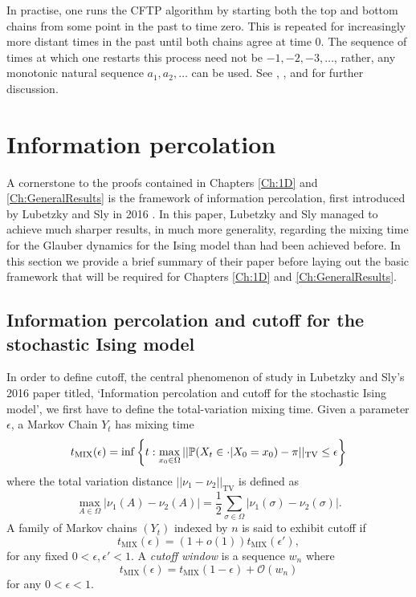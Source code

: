 	In practise, one runs the CFTP algorithm by starting both the top and bottom chains from some point in the past to time zero. This is repeated for increasingly more distant times in the past until both chains agree at time 0. The sequence of times at which one restarts this process need not be $-1, -2, -3, \dots$, rather, any monotonic natural sequence $a_1, a_2,\dots$ can  be used. See \cite{Levin2009-fo}, \cite{Haggstrom2002-os}, and \cite{Jerrum1998-ph} for further discussion.

	
\section{Information percolation}
	A cornerstone to the proofs contained in Chapters \ref{Ch:1D} and \ref{Ch:GeneralResults} is the framework of information percolation, first introduced by Lubetzky and Sly in 2016 \cite{Lubetzky2016-wd}. In this paper, Lubetzky and Sly managed to achieve much sharper results, in much more generality, regarding the mixing time for the Glauber dynamics for the Ising model than had been achieved before. In this section we provide a brief summary of their paper before laying out the basic framework that will be required for Chapters \ref{Ch:1D} and \ref{Ch:GeneralResults}.

	\subsection{Information percolation and cutoff for the stochastic Ising model}
	In order to define cutoff, the central phenomenon of study in Lubetzky and Sly's 2016 paper titled, `Information percolation and cutoff for the stochastic Ising model', we first have to define the total-variation mixing time. Given a parameter $\epsilon$, a Markov Chain $Y_t$ has mixing time
	\begin{equation}
		t_\mathrm{MIX}(\epsilon) = \inf\left\{t: \max_{x_0 \in \Omega} ||\mathbb{P}(X_t \in \cdot | X_0 = x_0) - \pi ||_\mathrm{TV} \leq \epsilon \right\}
	\end{equation}
	where the total variation distance $||\nu_1 - \nu_2||_\mathrm{TV}$ is defined as 
	\begin{equation}
		\max_{A \in \Omega}|\nu_1(A) - \nu_2(A)| = \frac{1}{2}\sum_{\sigma \in \Omega} |\nu_1(\sigma) - \nu_2(\sigma)|.
	\end{equation}
	A family of Markov chains $(Y_t)$ indexed by $n$ is said to exhibit cutoff if
	\begin{equation}
		t_\mathrm{MIX}(\epsilon) = (1 + o(1)) t_\mathrm{MIX}(\epsilon'),
	\end{equation}
	for any fixed $0 < \epsilon, \epsilon' < 1$. A \emph{cutoff window} is a sequence $w_n$ where
	\begin{equation}
		t_\mathrm{MIX}(\epsilon) = t_\mathrm{MIX}(1 - \epsilon) + \mathcal{O}(w_n)
	\end{equation}
	for any $0 < \epsilon <1$.

